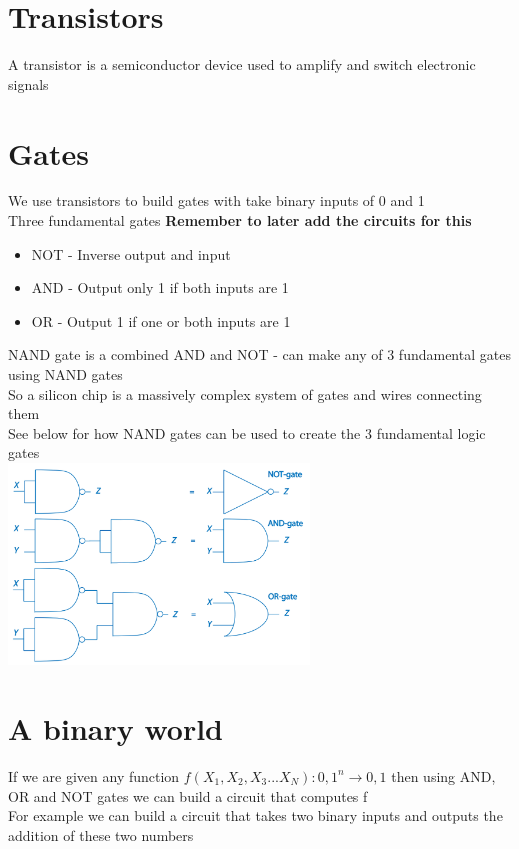 \documentclass{article}[18pt]
\begin{document}
\section{Transistors}
A transistor is a semiconductor device used to amplify and switch electronic signals\\
\section{Gates}
We use transistors to build gates with take binary inputs of 0 and 1\\
Three fundamental gates \textbf{Remember to later add the circuits for this}
\begin{itemize}
\item NOT - Inverse output and input
\item AND - Output only 1 if both inputs are 1
\item OR  - Output 1 if one or both inputs are 1
\end{itemize}
NAND gate is a combined AND and NOT - can make any of 3 fundamental gates using NAND gates\\
So a silicon chip is a massively complex system of gates and wires connecting them\\
See below for how NAND gates can be used to create the 3 fundamental logic gates\\
\includegraphics[width=8cm]{NAND.png}\\
\section{A binary world}
If we are given any function $f(X_1,X_2,X_3...X_N):{0,1}^n\rightarrow {0,1}$ then using AND, OR and NOT gates we can build a circuit that computes f\\
For example we can build a circuit that takes two binary inputs and outputs the addition of these two numbers\\
\end{document}
